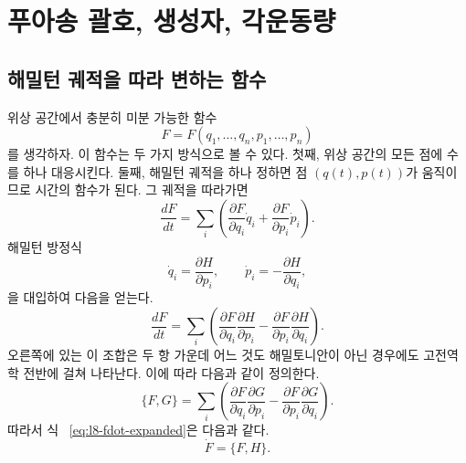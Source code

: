 \chapter{푸아송 괄호, 생성자, 각운동량}


\section{해밀턴 궤적을 따라 변하는 함수}

위상 공간에서 충분히 미분 가능한 함수 \[
  F=F(q_1,\ldots,q_n,p_1,\ldots,p_n)
\]를 생각하자. 이 함수는 두 가지 방식으로 볼 수 있다. 첫째, 위상 공간의 모든 점에 수를 하나 대응시킨다. 둘째, 해밀턴 궤적을 하나 정하면 점 \((q(t),p(t))\)가 움직이므로 시간의 함수가 된다. 그 궤적을 따라가면 \begin{equation}
  \frac{dF}{dt}
  =
  \sum_i\left(
    \frac{\partial F}{\partial q_i}\dot q_i
    +\frac{\partial F}{\partial p_i}\dot p_i
  \right).
  \label{eq:l8-chain-rule}
\end{equation} 해밀턴 방정식 \begin{equation}
  \dot q_i=\frac{\partial H}{\partial p_i},
  \qquad
  \dot p_i=-\frac{\partial H}{\partial q_i},
  \label{eq:l8-hamilton-equations}
\end{equation}을 대입하여 다음을 얻는다. \begin{equation}
  \frac{dF}{dt}
  =
  \sum_i\left(
    \frac{\partial F}{\partial q_i}
    \frac{\partial H}{\partial p_i}
    -
    \frac{\partial F}{\partial p_i}
    \frac{\partial H}{\partial q_i}
  \right).
  \label{eq:l8-fdot-expanded}
\end{equation} 오른쪽에 있는 이 조합은 두 항 가운데 어느 것도 해밀토니안이 아닌 경우에도 고전역학 전반에 걸쳐 나타난다. 이에 따라 다음과 같이 정의한다. \begin{equation}
  \boxed{
  \{F,G\}
  =
  \sum_i\left(
    \frac{\partial F}{\partial q_i}
    \frac{\partial G}{\partial p_i}
    -
    \frac{\partial F}{\partial p_i}
    \frac{\partial G}{\partial q_i}
  \right).}
  \label{eq:l8-poisson-definition}
\end{equation} 따라서 식 ~\eqref{eq:l8-fdot-expanded}은 다음과 같다. \begin{equation}
  \boxed{\dot F=\{F,H\}.}
  \label{eq:l8-time-generator}
\end{equation}

